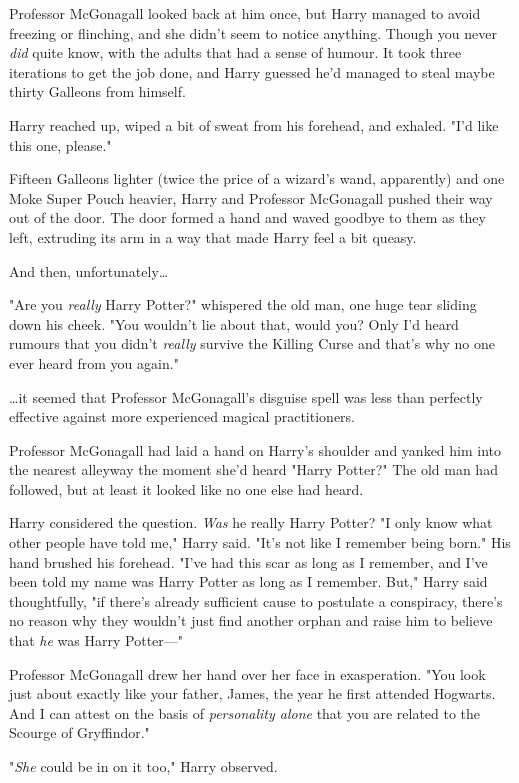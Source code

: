 Professor McGonagall looked back at him once, but Harry managed to avoid
freezing or flinching, and she didn't seem to notice anything. Though you never
\emph{did} quite know, with the adults that had a sense of humour. It took
three iterations to get the job done, and Harry guessed he'd managed to steal
maybe thirty Galleons from himself.

Harry reached up, wiped a bit of sweat from his forehead, and exhaled. "I'd
like this one, please."

Fifteen Galleons lighter (twice the price of a wizard's wand, apparently) and
one Moke Super Pouch  heavier, Harry and Professor McGonagall pushed their
way out of the door. The door formed a hand and waved goodbye to them as they
left, extruding its arm in a way that made Harry feel a bit queasy.

And then, unfortunately{\ldots}

"Are you \emph{really} Harry Potter?" whispered the old man, one huge tear
sliding down his cheek. "You wouldn't lie about that, would you? Only I'd heard
rumours that you didn't \emph{really} survive the Killing Curse and that's why
no one ever heard from you again."

{\ldots}it seemed that Professor McGonagall's disguise spell was less than
perfectly effective against more experienced magical practitioners.

Professor McGonagall had laid a hand on Harry's shoulder and yanked him into
the nearest alleyway the moment she'd heard "Harry Potter?" The old man had
followed, but at least it looked like no one else had heard.

Harry considered the question. \emph{Was} he really Harry Potter? "I only know
what other people have told me," Harry said. "It's not like I remember being
born." His hand brushed his forehead. "I've had this scar as long as I
remember, and I've been told my name was Harry Potter as long as I remember.
But," Harry said thoughtfully, "if there's already sufficient cause to
postulate a conspiracy, there's no reason why they wouldn't just find another
orphan and raise him to believe that \emph{he} was Harry Potter---"

Professor McGonagall drew her hand over her face in exasperation. "You look
just about exactly like your father, James, the year he first attended
Hogwarts. And I can attest on the basis of \emph{personality alone} that you
are related to the Scourge of Gryffindor."

"\emph{She} could be in on it too," Harry observed.

